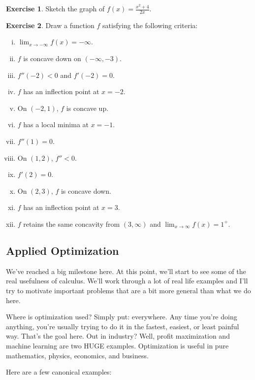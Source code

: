 \documentclass[leqno]{article}
\theoremstyle{definition}
\newtheorem{exercise}{Exercise}[section]
\theoremstyle{remark}
\theoremstyle{theorem}
\begin{document}
\begin{exercise}
Sketch the graph of $f(x)=\frac{x^2+4}{2x}$.  
\vspace*{10cm}\\
\end{exercise}

\begin{exercise}
Draw a function $f$ satisfying the following criteria:
\begin{enumerate}[(i)]
\item $\lim_{x\to -\infty} f(x)=-\infty$.
\item $f$ is concave down on $(-\infty, -3)$.
\item $f''(-2)<0$ and $f'(-2)=0$.
\item $f$ has an inflection point at $x=-2$.
\item On $(-2,1)$, $f$ is concave up.
\item $f$ has a local minima at $x=-1$.
\item $f''(1)=0$.
\item On $(1,2)$, $f''<0$.
\item $f'(2)=0$.
\item On $(2,3)$, $f$ is concave down.
\item $f$ has an inflection point at $x=3$.
\item $f$ retains the same concavity from $(3,\infty)$ and $\lim_{x\to \infty} f(x)=1^+$.
\end{enumerate}
\vspace*{6cm}
\end{exercise}

\subsection{Applied Optimization}

We've reached a big milestone here.  At this point, we'll start to see some of the real usefulness of calculus.  We'll work through a lot of real life examples and I'll try to motivate important problems that are a bit more general than what we do here.

Where is optimization used?  Simply put: everywhere.  Any time you're doing anything, you're usually trying to do it in the fastest, easiest, or least painful way.  That's the goal here.  Out in industry? Well, profit maximization and machine learning are two HUGE examples.  Optimization is useful in pure mathematics, physics, economics, and business.

Here are a few canonical examples:
\end{document}
